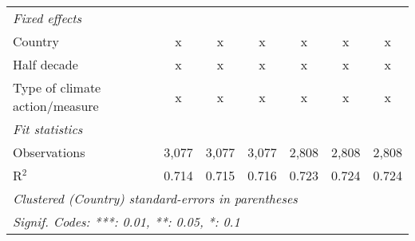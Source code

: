 \begin{tabular}{lcccccc}
   \emph{Fixed effects}\\
   Country                                                           & x       & x             & x              & x              & x             & x\\  
   Half decade                                                       & x       & x             & x              & x              & x             & x\\  
   Type of climate action/measure                                    & x       & x             & x              & x              & x             & x\\  
   \midrule \emph{Fit statistics}\\
   Observations                                                      & 3,077   & 3,077         & 3,077          & 2,808          & 2,808         & 2,808\\  
   R$^2$                                                             & 0.714   & 0.715         & 0.716          & 0.723          & 0.724         & 0.724\\  
   \midrule
   \multicolumn{7}{l}{\emph{Clustered (Country) standard-errors in parentheses}}\\
   \multicolumn{7}{l}{\emph{Signif. Codes: ***: 0.01, **: 0.05, *: 0.1}}\\
\end{tabular}
\par\endgroup


